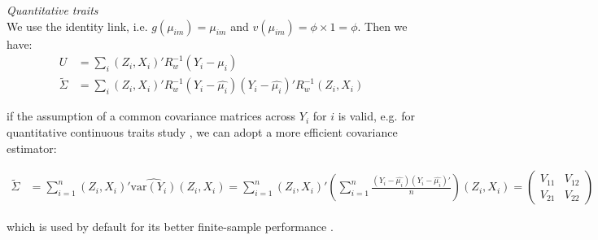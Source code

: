 \documentclass[compress]{beamer}
\begin{document}
{\newpage
\textit{Quantitative traits}\\
\indent We use the identity link, i.e. $g(\mu_{im}) = \mu_{im}$ and $v(\mu_{im}) = \phi \times 1 = \phi$. Then we have:
\begin{align}
U & = \sum_{i}\left(Z_{i},X_{i}\right)' R_w^{-1} (Y_{i}-\mu_{i}) \nonumber\\
\widetilde{\Sigma} & = \sum_{i}\left(Z_{i},X_{i}\right)' R_w^{-1} (Y_{i}-\hat{\mu_{i}})(Y_{i}-\hat{\mu_{i}})' R_w^{-1} \left(Z_{i},X_{i}\right)
\label{eq:2}
\end{align}

if the assumption of a common covariance matrices across $Y_i$ for $i$ is valid, e.g. for quantitative continuous traits study \cite{pan2001robust}, we can adopt a more efficient covariance estimator:
\begin{tiny}
\begin{align*}
\widetilde{\Sigma} & = \sum_{i=1}^n \left(Z_{i},X_{i}\right)'\widehat{\textrm{var}(Y_{i})}\left(Z_{i},X_{i}\right)
 = \sum_{i=1}^n \left(Z_{i},X_{i}\right)'\left(\sum_{i=1}^n \frac{(Y_{i}-\hat{\mu_{i}})(Y_{i}-\hat{\mu_{i}})'}{n}\right)\left(Z_{i},X_{i}\right) = 
\begin{pmatrix}
V_{11} & V_{12}\\
 V_{21} & V_{22}
\end{pmatrix}
\end{align*}
\end{tiny}
which is used by default for its better finite-sample performance \cite{pan2001robust}.\\

}
\end{document}
